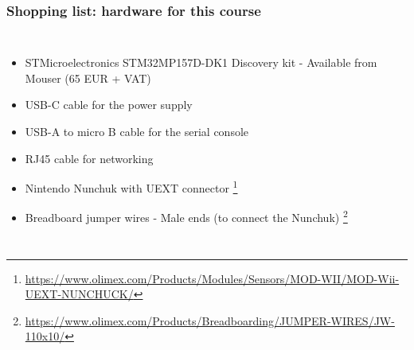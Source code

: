 \begin{frame}
\frametitle{Shopping list: hardware for this course}
  \begin{columns}
    \footnotesize
    \begin{itemize}
      \item STMicroelectronics STM32MP157D-DK1 Discovery kit -
        Available from Mouser (65 EUR + VAT)
      \item USB-C cable for the power supply
      \item USB-A to micro B cable for the serial console
      \item RJ45 cable for networking
      \item Nintendo Nunchuk with UEXT connector
            \footnote{\tiny \url{https://www.olimex.com/Products/Modules/Sensors/MOD-WII/MOD-Wii-UEXT-NUNCHUCK/}}
      \item Breadboard jumper wires - Male ends (to connect the Nunchuk)
            \footnote{\tiny \url{https://www.olimex.com/Products/Breadboarding/JUMPER-WIRES/JW-110x10/}}


\end{itemize}
\end{columns}
\end{frame}
